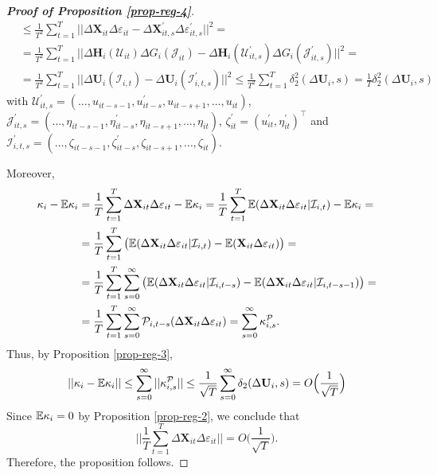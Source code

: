 \begin{proof}[\textnormal{\textbf{Proof of Proposition \ref{prop-reg-4}}}]
\begin{align*}
&\leq \frac{1}{T^2} \sum_{t=1}^T \Big|\Big| \Delta \mathbf{X}_{it}\Delta \varepsilon_{it} -\Delta \mathbf{X}_{it, s}^\prime\Delta \varepsilon_{it, s}^\prime\Big|\Big|^2 =\\
& = \frac{1}{T^2} \sum_{t=1}^T \Big|\Big| \Delta \mathbf{H}_i(\mathcal{U}_{it})  \Delta G_i(\mathcal{J}_{it}) - \Delta \mathbf{H}_i(\mathcal{U}_{it, s}^\prime)  \Delta G_i(\mathcal{J}_{it, s}^\prime)\Big|\Big|^2 =\\
& = \frac{1}{T^2} \sum_{t=1}^T \Big|\Big| \Delta \mathbf{U}_i(\mathcal{I}_{i,t})  - \Delta \mathbf{U}_i(\mathcal{I}_{i,t, s}^\prime) \Big|\Big|^2 \leq \frac{1}{T^2} \sum_{t=1}^T \delta_2^2(\Delta \mathbf{U}_i, s) = \frac{1}{T}\delta_2^2(\Delta \mathbf{U}_i, s)
\end{align*}
with $\mathcal{U}_{it, s}^\prime = (\ldots, u_{it-s-1}, u^\prime_{it-s}, u_{it-s+1}, \ldots, u_{it})$, $\mathcal{J}_{it, s}^\prime = (\ldots, \eta_{it-s-1}, \eta^\prime_{it-s}, \eta_{it-s+1}, \ldots, \eta_{it})$, $\zeta^\prime_{it} = (u_{it}^\prime, \eta_{it}^\prime)^\top$ and $\mathcal{I}_{i,t,s}^\prime =(\ldots, \zeta_{it-s-1}, \zeta^\prime_{it-s}, \zeta_{it-s+1}, \ldots, \zeta_{it})$.

Moreover,
\begin{align*}
\kappa_i - \mathbb{E} \kappa_i &= \frac{1}{T}\sum_{t=1}^T \Delta \mathbf{X}_{it}\Delta \varepsilon_{it} - \mathbb{E} \kappa_i = \frac{1}{T}\sum_{t=1}^T \mathbb{E} ( \Delta \mathbf{X}_{it}\Delta \varepsilon_{it}|\mathcal{I}_{i,t}) - \mathbb{E} \kappa_i =\\
&= \frac{1}{T}\sum_{t=1}^T \big( \mathbb{E} ( \Delta \mathbf{X}_{it}\Delta \varepsilon_{it}|\mathcal{I}_{i,t} ) - \mathbb{E} ( \mathbf{X}_{it}\Delta \varepsilon_{it}) \big) = \\
&= \frac{1}{T}\sum_{t=1}^T \sum_{s=0}^\infty \big( \mathbb{E} ( \Delta \mathbf{X}_{it}\Delta \varepsilon_{it}|\mathcal{I}_{i,t-s} ) - \mathbb{E} ( \Delta \mathbf{X}_{it}\Delta \varepsilon_{it}|\mathcal{I}_{i,t-s-1} )  \big) =\\
&= \frac{1}{T}\sum_{t=1}^T \sum_{s=0}^\infty \mathcal{P}_{i, t-s} (\Delta \mathbf{X}_{it}\Delta \varepsilon_{it}) = \sum_{s=0}^\infty \kappa_{i, s}^{\mathcal{P}}.
\end{align*}
Thus, by Proposition \ref{prop-reg-3},
\[ || \kappa_i - \mathbb{E} \kappa_i || \leq \sum_{s=0}^\infty ||\kappa_{i, s}^{\mathcal{P}} || \leq \frac{1}{\sqrt{T}}\sum_{s=0}^\infty \delta_2(\Delta \mathbf{U}_i, s) = O\Big(\frac{1}{\sqrt{T}}\Big)
\]
Since $\mathbb{E} \kappa_i = 0$ by Proposition \ref{prop-reg-2}, we conclude that
\[  \Big|\Big| \frac{1}{T}\sum_{t=1}^T  \Delta \mathbf{X}_{it}\Delta \varepsilon_{it} \Big|\Big| = O\Big(\frac{1}{\sqrt{T}}\Big).
\]
Therefore, the proposition follows.
\end{proof}



